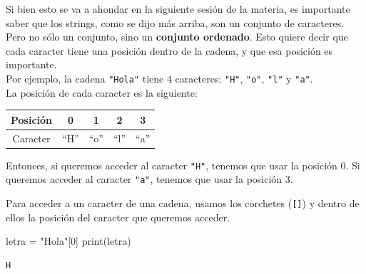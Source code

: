 \documentclass[
  letterpaper,
  DIV=11,
  numbers=noendperiod]{scrreprt}
\newenvironment{Shaded}{\begin{snugshade}}{\end{snugshade}}
\newcommand{\BuiltInTok}[1]{\textcolor[rgb]{0.00,0.23,0.31}{#1}}
\newcommand{\DecValTok}[1]{\textcolor[rgb]{0.68,0.00,0.00}{#1}}
\newcommand{\NormalTok}[1]{\textcolor[rgb]{0.00,0.23,0.31}{#1}}
\newcommand{\OperatorTok}[1]{\textcolor[rgb]{0.37,0.37,0.37}{#1}}
\newcommand{\StringTok}[1]{\textcolor[rgb]{0.13,0.47,0.30}{#1}}
\begin{document}
Si bien esto se va a ahondar en la siguiente sesión de la materia, es
importante saber que los strings, como se dijo más arriba, son un
conjunto de caracteres. Pero no sólo un conjunto, sino un
\textbf{conjunto ordenado}. Esto quiere decir que cada caracter tiene
una posición dentro de la cadena, y que esa posición es importante.\\

Por ejemplo, la cadena \texttt{"Hola"} tiene 4 caracteres: \texttt{"H"},
\texttt{"o"}, \texttt{"l"} y \texttt{"a"}.\\
La posición de cada caracter es la siguiente:

\begin{longtable}[]{@{}ccccc@{}}
\toprule\noalign{}
Posición & 0 & 1 & 2 & 3 \\
\midrule\noalign{}
\endhead
\bottomrule\noalign{}
\endlastfoot
Caracter & ``H'' & ``o'' & ``l'' & ``a'' \\
\end{longtable}

Entonces, si queremos acceder al caracter \texttt{"H"}, tenemos que usar
la posición 0. Si queremos acceder al caracter \texttt{"a"}, tenemos que
usar la posición 3.\\

\begin{tcolorbox}[enhanced jigsaw, bottomrule=.15mm, leftrule=.75mm, opacityback=0, colback=white, toprule=.15mm, bottomtitle=1mm, opacitybacktitle=0.6, rightrule=.15mm, left=2mm, arc=.35mm, coltitle=black, title=\textcolor{quarto-callout-tip-color}{\faLightbulb}\hspace{0.5em}{Tip}, breakable, toptitle=1mm, colframe=quarto-callout-tip-color-frame, titlerule=0mm, colbacktitle=quarto-callout-tip-color!10!white]

Para acceder a un caracter de una cadena, usamos los corchetes
(\texttt{{[}{]}}) y dentro de ellos la posición del caracter que
queremos acceder.\\

\end{tcolorbox}

\begin{Shaded}
\begin{Highlighting}[]
\NormalTok{letra }\OperatorTok{=} \StringTok{"Hola"}\NormalTok{[}\DecValTok{0}\NormalTok{]}
\BuiltInTok{print}\NormalTok{(letra)}
\end{Highlighting}
\end{Shaded}

\begin{verbatim}
H
\end{verbatim}
\end{document}
